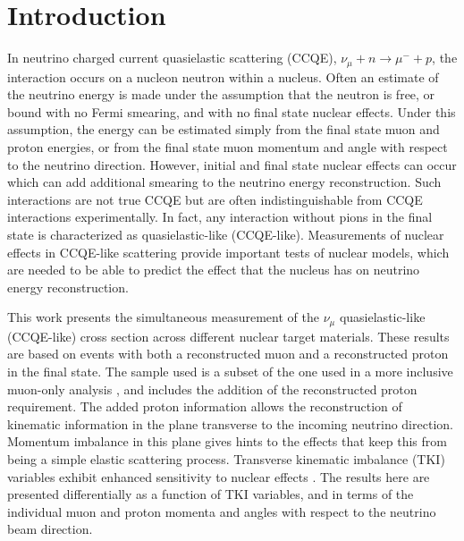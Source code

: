 \documentclass[aps,prd,twocolumn,showpacs,superscriptaddress,floatfix]{revtex4-2}  %
\begin{document}
\maketitle


\section{Introduction}

In neutrino charged current quasielastic scattering (CCQE), $\nu_\mu + n \to \mu^- + p$, the interaction occurs on a nucleon neutron within a nucleus. Often an estimate of the neutrino energy is made under the assumption that the neutron is free, or bound with no Fermi smearing, and with no final state nuclear effects.
Under this assumption, the energy can be estimated simply from the final state muon and proton energies, or from the final state muon momentum and angle with respect to the neutrino direction.  
 However,  initial and final state nuclear effects can occur which can add additional smearing to 
 the neutrino energy reconstruction.  Such interactions are not true CCQE but are often indistinguishable from CCQE interactions experimentally.  In fact, any interaction without pions in the final state is characterized as 
 quasielastic-like (CCQE-like). Measurements of nuclear effects in CCQE-like scattering provide important tests of nuclear models, which are needed to be able to predict the effect that the nucleus has on neutrino energy reconstruction.   


This work presents the simultaneous measurement of the $\nu_{\mu}$ quasielastic-like (CCQE-like) cross section across different nuclear target materials.  These results are based on events with both a reconstructed muon and a reconstructed proton in the final state. The sample used is a subset of the one used in a more inclusive muon-only analysis \cite{jk_1trk_prl}, and includes the addition of the reconstructed proton requirement. 
The added proton information allows the reconstruction of kinematic information in the plane transverse to the incoming neutrino direction. 
 Momentum imbalance in this plane gives hints to the effects that keep this from being a simple elastic scattering process.  Transverse kinematic imbalance (TKI) variables
 exhibit enhanced sensitivity to nuclear effects \cite{Lu:2015tcr}.  The results here are presented differentially as a function of TKI variables, and in terms of the individual muon and proton momenta and angles with respect to the neutrino beam direction. 
\end{document}
